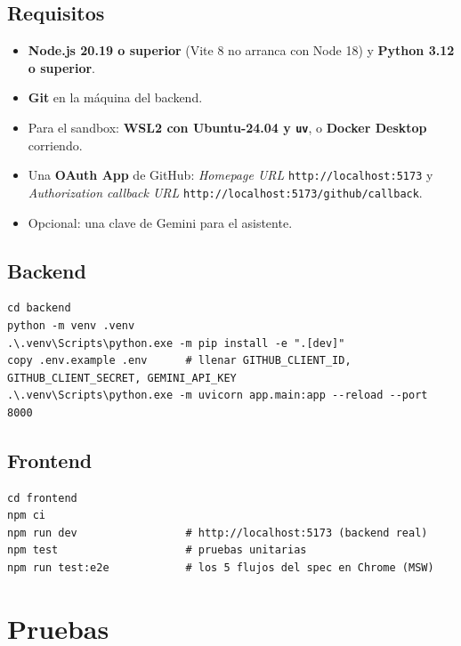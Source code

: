 \documentclass[11pt,a4paper]{article}
\newcommand{\code}[1]{\texttt{\small #1}}
\begin{document}
\subsection{Requisitos}
\begin{itemize}
  \item \textbf{Node.js 20.19 o superior} (Vite 8 no arranca con Node 18) y \textbf{Python 3.12 o superior}.
  \item \textbf{Git} en la máquina del backend.
  \item Para el sandbox: \textbf{WSL2 con Ubuntu-24.04 y \code{uv}}, o \textbf{Docker Desktop} corriendo.
  \item Una \textbf{OAuth App} de GitHub: \emph{Homepage URL} \code{http://localhost:5173} y \emph{Authorization
        callback URL} \code{http://localhost:5173/github/callback}.
  \item Opcional: una clave de Gemini para el asistente.
\end{itemize}

\subsection{Backend}
\begin{lstlisting}[language=texto]
cd backend
python -m venv .venv
.\.venv\Scripts\python.exe -m pip install -e ".[dev]"
copy .env.example .env      # llenar GITHUB_CLIENT_ID, GITHUB_CLIENT_SECRET, GEMINI_API_KEY
.\.venv\Scripts\python.exe -m uvicorn app.main:app --reload --port 8000
\end{lstlisting}

\subsection{Frontend}
\begin{lstlisting}[language=texto]
cd frontend
npm ci
npm run dev                 # http://localhost:5173 (backend real)
npm test                    # pruebas unitarias
npm run test:e2e            # los 5 flujos del spec en Chrome (MSW)
\end{lstlisting}

\section{Pruebas}
\end{document}
